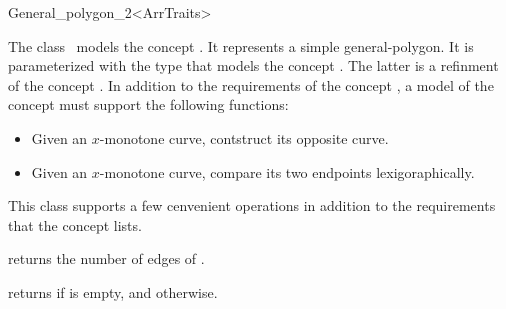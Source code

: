 \ccRefPageBegin

\begin{ccRefClass}{General_polygon_2<ArrTraits>}

\ccThreeToTwo

\ccDefinition
The class \ccRefName\ models the concept .
It represents a simple general-polygon. It is parameterized with the type
 that models the concept
. The latter is a refinment
of the concept . In addition to the
requirements of the concept , a
model of the concept  must
support the following functions:
\begin{itemize}
\item Given an $x$-monotone curve, contstruct its opposite curve.
\item Given an $x$-monotone curve, compare its two endpoints lexigoraphically.
\end{itemize} 

This class supports a few cenvenient operations in addition to the 
requirements that the concept  lists.

 
\ccTypes



% 
% 

\ccOperations
 {returns the number of edges of \ccVar.}

\ccModifiers


\ccPredicates
{returns  if \ccVar is empty, and  otherwise.}



\ccIsModel

\end{ccRefClass}
\ccRefPageEnd
